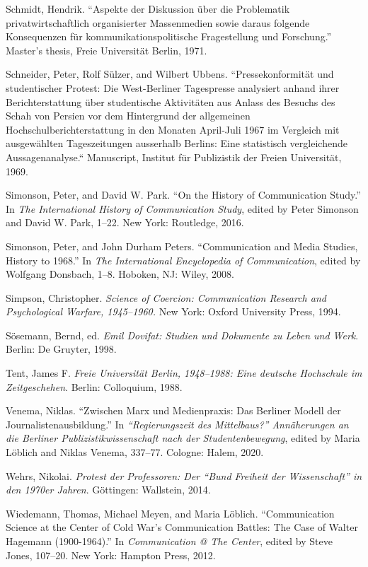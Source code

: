 \documentclass{tufte-handout}
\begin{document}
\begin{hangparas}{.25in}{1}
Schmidt, Hendrik. ``Aspekte der Diskussion über die Problematik
privatwirtschaftlich organisierter Massenmedien sowie daraus folgende
Konsequenzen für kommunikationspolitische Fragestellung und Forschung.''
Master's thesis, Freie Universität Berlin, 1971.

Schneider, Peter, Rolf Sülzer, and Wilbert Ubbens. ``Pressekonformität
und studentischer Protest: Die West-Berliner Tagespresse analysiert
anhand ihrer Berichterstattung über studentische Aktivitäten aus Anlass
des Besuchs des Schah von Persien vor dem Hintergrund der allgemeinen
Hochschulberichterstattung in den Monaten April-Juli 1967 im Vergleich
mit ausgewählten Tageszeitungen ausserhalb Berlins: Eine statistisch
vergleichende Aussagenanalyse.`` Manuscript, Institut für Publizistik
der Freien Universität, 1969.

Simonson, Peter, and David W. Park. ``On the History of Communication
Study.'' In \emph{The International History of Communication Study},
edited by Peter Simonson and David W. Park, 1--22. New York: Routledge,
2016.

Simonson, Peter, and John Durham Peters. ``Communication and Media
Studies, History to 1968.'' In \emph{The International Encyclopedia of
Communication}, edited by Wolfgang Donsbach, 1--8. Hoboken, NJ: Wiley,
2008.

Simpson, Christopher. \emph{Science of Coercion: Communication Research
and Psychological Warfare, 1945--1960.} New York: Oxford University
Press, 1994.

Sösemann, Bernd, ed. \emph{Emil Dovifat: Studien und Dokumente zu Leben
und Werk}. Berlin: De Gruyter, 1998.

Tent, James F. \emph{Freie Universität Berlin, 1948--1988: Eine deutsche
Hochschule im Zeitgeschehen}. Berlin: Colloquium, 1988.

Venema, Niklas. ``Zwischen Marx und Medienpraxis: Das Berliner Modell
der Journalistenausbildung.'' In \emph{``Regierungszeit des
Mittelbaus?'' Annäherungen an die Berliner Publizistikwissenschaft nach
der Studentenbewegung}, edited by Maria Löblich and Niklas Venema,
337--77. Cologne: Halem, 2020.

Wehrs, Nikolai. \emph{Protest der Professoren: Der ``Bund Freiheit der
Wissenschaft'' in den 1970er Jahren}. Göttingen: Wallstein, 2014.

Wiedemann, Thomas, Michael Meyen, and Maria Löblich. ``Communication
Science at the Center of Cold War's Communication Battles: The Case of
Walter Hagemann (1900-1964).'' In \emph{Communication @ The Center},
edited by Steve Jones, 107--20. New York: Hampton Press, 2012.


\end{hangparas}
\end{document}
